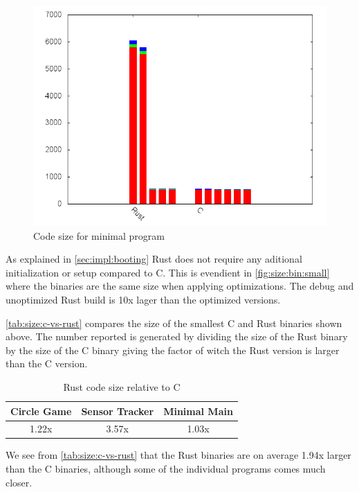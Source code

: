 \begin{figure}[H]
  \begin{center}
    \includegraphics[scale=0.5]{results/plots/size/bin/small/size.png}
  \end{center}
  \caption{Code size for minimal program}
  \label{fig:size:bin:small}
\end{figure}

As explained in \autoref{sec:impl:booting} Rust does not require any aditional initialization or setup compared to C.
This is evendient in \autoref{fig:size:bin:small} where the binaries are the same size when applying optimizations.
The debug and unoptimized Rust build is 10x lager than the optimized versions.

\autoref{tab:size:c-vs-rust} compares the size of the smallest C and Rust binaries shown above.
The number reported is generated by dividing the size of the Rust binary by the size of the C binary giving the factor of witch the Rust version is larger than the C version.

\begin{table}[H]
  \centering
  \begin{tabular}{|c|c|c|}
    \hline
    Circle Game & Sensor Tracker & Minimal Main \\
    \hline
    1.22x & 3.57x & 1.03x \\
    \hline
  \end{tabular}
  \caption{Rust code size relative to C}
  \label{tab:size:c-vs-rust}
\end{table}

We see from \autoref{tab:size:c-vs-rust} that the Rust binaries are on average 1.94x larger than the C binaries, although some of the individual programs comes much closer.

